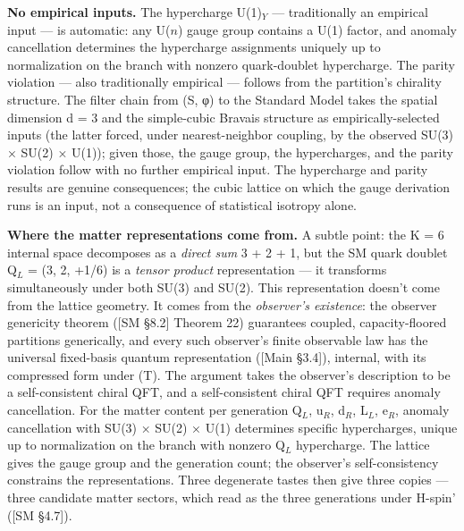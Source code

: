 \documentclass[
]{article}
\begin{document}
\textbf{No empirical inputs.} The hypercharge U(1)\(_Y\) ---
traditionally an empirical input --- is automatic: any U(\(n\)) gauge
group contains a U(1) factor, and anomaly cancellation determines the
hypercharge assignments uniquely up to normalization on the branch with
nonzero quark-doublet hypercharge. The parity violation --- also
traditionally empirical --- follows from the partition's chirality
structure. The filter chain from (S, φ) to the Standard Model takes the
spatial dimension d = 3 and the simple-cubic Bravais structure as
empirically-selected inputs (the latter forced, under nearest-neighbor
coupling, by the observed SU(3) × SU(2) × U(1)); given those, the gauge
group, the hypercharges, and the parity violation follow with no further
empirical input. The hypercharge and parity results are genuine
consequences; the cubic lattice on which the gauge derivation runs is an
input, not a consequence of statistical isotropy alone.

\textbf{Where the matter representations come from.} A subtle point: the
K = 6 internal space decomposes as a \emph{direct sum} 3 + 2 + 1, but
the SM quark doublet Q\(_L\) = (3, 2, +1/6) is a \emph{tensor product}
representation --- it transforms simultaneously under both SU(3) and
SU(2). This representation doesn't come from the lattice geometry. It
comes from the \emph{observer's existence}: the observer genericity
theorem ({[}SM §8.2{]} Theorem 22) guarantees coupled, capacity-floored
partitions generically, and every such observer's finite observable law
has the universal fixed-basis quantum representation ({[}Main §3.4{]}),
internal, with its compressed form under (T). The argument takes the
observer's description to be a self-consistent chiral QFT, and a
self-consistent chiral QFT requires anomaly cancellation. For the matter
content per generation Q\(_L\), u\(_R\), d\(_R\), L\(_L\), e\(_R\),
anomaly cancellation with SU(3) × SU(2) × U(1) determines specific
hypercharges, unique up to normalization on the branch with nonzero
Q\(_L\) hypercharge. The lattice gives the gauge group and the
generation count; the observer's self-consistency constrains the
representations. Three degenerate tastes then give three copies ---
three candidate matter sectors, which read as the three generations
under H-spin' ({[}SM §4.7{]}).
\end{document}

